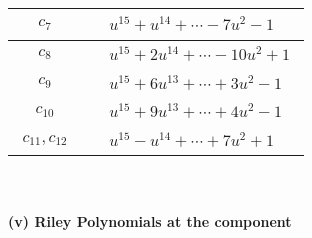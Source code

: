 \documentclass[1p]{elsarticle_modified}
\theoremstyle{definition}
\begin{document}
\begin{tabular}{m{50pt}|m{274pt}}
\hline $$\begin{aligned}c_{7}\end{aligned}$$&$\begin{aligned}
&u^{15}+u^{14}+\cdots-7 u^2-1
\end{aligned}$\\
\hline $$\begin{aligned}c_{8}\end{aligned}$$&$\begin{aligned}
&u^{15}+2 u^{14}+\cdots-10 u^2+1
\end{aligned}$\\
\hline $$\begin{aligned}c_{9}\end{aligned}$$&$\begin{aligned}
&u^{15}+6 u^{13}+\cdots+3 u^2-1
\end{aligned}$\\
\hline $$\begin{aligned}c_{10}\end{aligned}$$&$\begin{aligned}
&u^{15}+9 u^{13}+\cdots+4 u^2-1
\end{aligned}$\\
\hline $$\begin{aligned}c_{11},c_{12}\end{aligned}$$&$\begin{aligned}
&u^{15}- u^{14}+\cdots+7 u^2+1
\end{aligned}$\\
\hline
\end{tabular}\\~\\
\newpage\renewcommand{\arraystretch}{1}
\flushleft \textbf{(v) Riley Polynomials at the component}\newline \\
\end{document}
